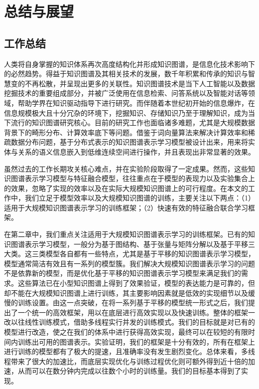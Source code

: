 \chapter{总结与展望}
\label{cha:conclusion}

\section{工作总结}

人类将自身掌握的知识体系再次高度结构化并形成知识图谱，是信息化技术影响下的必然趋势。得益于知识图谱及其相关技术的发展，数千年积累和传承的知识与智慧变的不再松散，并呈现出更多的关联性。知识图谱技术是当下人工智能以及数据挖掘技术的重要组成部分，并被广泛使用在信息检索、问答系统以及智能对话等领域，帮助学界在知识驱动指导下进行研究。而伴随着本世纪初开始的信息爆炸，在信息规模极大且十分冗杂的环境下，挖掘知识、存储知识乃至于理解知识，成为当下流行的知识图谱研究核心。目前的研究工作也面临诸多难题，尤其是大规模数据背景下的畸形分布、计算效率底下等问题。借鉴于词向量算法来解决计算效率和稀疏数据分布问题，基于分布式表示的知识图谱表示学习模型被设计出来，用来将实体与关系的语义信息嵌入到低维连续空间进行操作，并且表现出非常显著的效果。

虽然过去的工作长期攻关核心难点，并在实验阶段取得了一定成果。然而，这些知识图谱表示学习模型与特征融合模型，往往重点在于模型的表现力以及实验集合上的效果，忽略了实现的效率以及在实际大规模知识图谱上的可行程度。在本文的工作中，我们立足于模型效率以及大规模知识图谱的训练，主要关注以下两点：（1）适用于大规模知识图谱表示学习的训练框架；（2）快速有效的特征融合联合学习框架。

在第二章中，我们重点关注适用于大规模知识图谱表示学习的训练框架。已有的知识图谱表示学习模型，一般分为基于图结构、基于张量与矩阵分解以及基于平移三大类。这三类模型各自都有一些特点，尤其是基于平移的知识图谱表示学习模型，模型通常简洁有效且有一系列的模型簇。我们解决大规模知识图谱表示学习的问题不是依靠新的模型，而是优化基于平移的知识图谱表示学习模型来满足我们的需求。这些算法已在小型知识图谱上得到了效果验证，模型的表达能力是可靠的，但却不能在大规模知识图谱上进行训练，其主要影响因素就是低效的实现细节以及缓慢的训练设置。由这一点突破，在将一系列基于平移的模型统一形式之后，我们提出了一个统一的高效框架，用以在底层进行高效实现以及快速训练。整体的框架一改以往线性训练模式，借助多线程实行并发的训练模式。我们的目标就是对已有的模型进行改造，使之在我们的体系中进行获得高效实现，最终可以在较短的有限时间内训练出可用的图谱表示。实验证明，我们的框架是十分有效的，所有在框架上进行训练的模型都有了极大的提速，且准确率没有发生剧烈变化。总体来看，多线程带来了很大的加速比，而底层实现优化与训练过程优化则可额外得到近十倍的加速，从而可以在数分钟内完成以往数个小时的训练量。我们的目标基本得到了实现。


